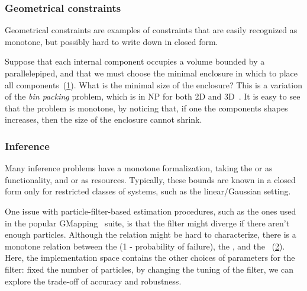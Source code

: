 \subsubsection{Geometrical constraints}

Geometrical constraints are examples of constraints that are easily recognized as monotone, but possibly hard to write down in closed form.

\begin{example}
    Suppose that each internal component occupies a volume bounded by a parallelepiped, and that we must choose the minimal enclosure in which to place all components~(\cref{fig:packing}).
    What is the minimal size of the enclosure?
    This is a variation of the \emph{bin packing} problem, which is in NP for both 2D and 3D~\cite{lodi02two}.
    It is easy to see that the problem is monotone, by noticing that, if one the components shapes increases, then the size of the enclosure cannot shrink.

\end{example}
\begin{figure}[tbh]
    \centering
    \caption{}
    \label{fig:packing}
\end{figure}

\subsubsection{Inference}

Many inference problems have a monotone formalization, taking the
 or  as functionality, and 
or  as resources.
Typically, these bounds are known in a closed form only for restricted classes of systems, such as the linear/Gaussian setting.

\begin{example}[SLAM]
    One issue with particle-filter-based estimation procedures, such as the ones used in the popular GMapping~\cite{grisetti07improved} suite, is that the filter might diverge if there aren't enough particles.
    Although the relation might be hard to characterize, there is a monotone relation between the  (1 - probability of failure), the , and the ~(\cref{fig:gmapping}).
    Here, the implementation space contains the other choices of parameters for the filter: fixed the number of particles, by changing the tuning of the filter, we can explore the trade-off of accuracy and robustness.
\end{example}
\begin{figure}[h]
    \centering
    \caption{}
    \label{fig:gmapping}
\end{figure}

